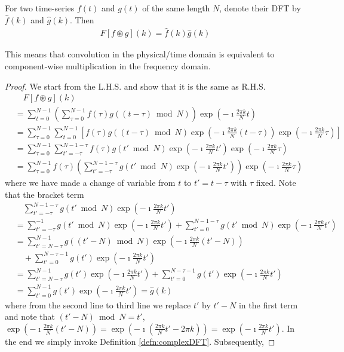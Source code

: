 \begin{thm}
\label{thm:circonv}
For two time-series $f(t)$ and $g(t)$ of the same length $N$, denote their DFT by $\hat{f}(k)$ and $\hat{g}(k)$. Then
\begin{align*}
F[f \circledast g](k) = \hat{f}(k)\hat{g}(k)
\end{align*}
\end{thm}
This means that convolution in the physical/time domain is equivalent to component-wise multiplication in the frequency domain.
\begin{proof}
We start from the L.H.S. and show that it is the same as R.H.S.
\begin{align*}
&\quad F[f \circledast g](k) \\
&= \sum_{t=0}^{N-1} \left(\sum_{\tau=0}^{N-1} f(\tau) g((t-\tau) \bmod N)\right) \exp(-\imath\frac{2\pi k}{N}t) \\
&= \sum_{\tau=0}^{N-1} \sum_{t=0}^{N-1} \left[f(\tau) g((t-\tau) \bmod N) \exp(-\imath\frac{2\pi k}{N}(t-\tau)) \exp(-\imath\frac{2\pi k}{N}\tau)\right] \\
&= \sum_{\tau=0}^{N-1} \sum_{t'=-\tau}^{N-1-\tau}  f(\tau) g(t' \bmod N) \exp(-\imath\frac{2\pi k}{N}t') \exp(-\imath\frac{2\pi k}{N}\tau) \\
&= \sum_{\tau=0}^{N-1} f(\tau) \left(\sum_{t'=-\tau}^{N-1-\tau} g(t' \bmod N) \exp(-\imath\frac{2\pi k}{N}t')\right) \exp(-\imath\frac{2\pi k}{N}\tau)
\end{align*}
where we have made a change of variable from $t$ to $t' = t - \tau$ with $\tau$ fixed. Note that the bracket term
\begin{align*}
&\quad \sum_{t'=-\tau}^{N-1-\tau} g(t' \bmod N) \exp(-\imath\frac{2\pi k}{N}t') \\
&= \sum_{t'=-\tau}^{-1} g(t' \bmod N) \exp(-\imath\frac{2\pi k}{N}t') +  \sum_{t'=0}^{N-1-\tau} g(t' \bmod N) \exp(-\imath\frac{2\pi k}{N}t') \\
&= \sum_{t'=N-\tau}^{N-1} g((t'-N) \bmod N) \exp(-\imath\frac{2\pi k}{N}(t'-N)) \\
&\quad + \sum_{t'=0}^{N-\tau-1} g(t') \exp(-\imath\frac{2\pi k}{N}t') \\
&= \sum_{t'=N-\tau}^{N-1} g(t') \exp(-\imath\frac{2\pi k}{N}t') + \sum_{t'=0}^{N-\tau-1} g(t') \exp(-\imath\frac{2\pi k}{N}t') \\
&= \sum_{t'=0}^{N-1} g(t') \exp(-\imath\frac{2\pi k}{N}t') = \hat{g}(k)
\end{align*}
where from the second line to third line we replace $t'$ by $t' - N$ in the first term and note that $(t' - N) \bmod N = t'$, $\exp(-\imath\frac{2\pi k}{N}(t'-N)) = \exp(-\imath(\frac{2\pi k}{N}t' - 2\pi k)) = \exp(-\imath\frac{2\pi k}{N}t')$. In the end we simply invoke Definition \ref{defn:complexDFT}. Subsequently,

\end{proof}
